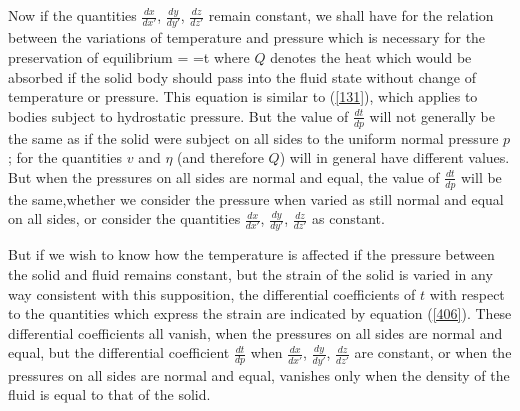 \documentclass[12pt]{article}
\begin{document}
{Now if the quantities $\frac{dx}{dx'}$, $\frac{dy}{dy'}$, $\frac{dz}{dz'}$ remain constant, we shall have for the relation between the variations of temperature and pressure which is necessary for the preservation of equilibrium
\eqs {} = =t  \label{407}\eqe
where $Q$ denotes the heat which would be absorbed if the solid body should pass into the fluid state without change of temperature or pressure. This equation is similar to (\ref{131}), which applies to bodies subject to hydrostatic pressure. But the value of $\frac{dt}{dp}$ will not generally be the same as if the solid were subject on all sides to the uniform normal pressure $p$; for the quantities $v$ and $\eta$ (and therefore $Q$) will in general have different values. But when the pressures on all sides are normal and equal, the value of $\frac{dt}{dp}$  will be the same,whether we consider the pressure when varied as still normal and equal on all sides, or consider the quantities $\frac{dx}{dx'}$, $\frac{dy}{dy'}$, $\frac{dz}{dz'}$ as constant.

But if we wish to know how the temperature is affected if the pressure between the solid and fluid remains constant, but the strain of the solid is varied in any way consistent with this supposition, the differential coefficients of $t$ with respect to the quantities which express the strain are indicated by equation (\ref{406}). These differential coefficients all vanish, when the pressures on all sides are normal and equal, but the differential coefficient $\frac{dt}{dp}$ when $\frac{dx}{dx'}$, $\frac{dy}{dy'}$, $\frac{dz}{dz'}$ are constant, or when the pressures on all sides are normal and equal, vanishes only when the density of the fluid is equal to that of the solid.


}
\end{document}

